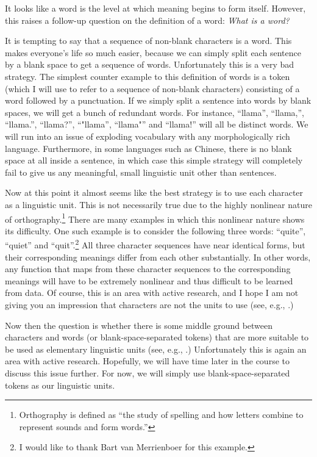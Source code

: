\documentclass{report}
\begin{document}
It looks like a word is the level at which meaning begins to form itself.
However, this raises a follow-up question on the definition of a word: {\em What
is a word?}

It is tempting to say that a sequence of non-blank characters is a word. This
makes everyone's life so much easier, because we can simply split each sentence
by a blank space to get a sequence of words. Unfortunately this is a very bad
strategy. The simplest counter example to this definition of words is a token
(which I will use to refer to a sequence of non-blank characters) consisting of
a word followed by a punctuation. If we simply split a sentence into words by
blank spaces, we will get a bunch of redundant words. For instance, ``llama'',
``llama,'', ``llama.'', ``llama?'', ``"llama'', ``llama"'' and ``llama!'' will
all be distinct words. We will run into an issue of exploding vocabulary with
any morphologically rich language. Furthermore, in some languages such as
Chinese, there is no blank space at all inside a sentence, in which case this
simple strategy will completely fail to give us any meaningful, small linguistic
unit other than sentences.

Now at this point it almost seems like the best strategy is to use each
character as a linguistic unit. This is not necessarily true due to the highly
nonlinear nature of orthography.\footnote{
    Orthography is defined as ``the study of spelling and how letters combine to
    represent sounds and form words.''
} There are many examples in which this nonlinear nature shows its difficulty.
One such example is to consider the following three words: ``quite'', ``quiet''
and ``quit''.\footnote{
    I would like to thank Bart van Merrienboer for this example.
}
All three character sequences have near identical forms, but their corresponding
meanings differ from each other substantially. In other words, any function that
maps from these character sequences to the corresponding meanings will have to
be extremely nonlinear and thus difficult to be learned from data. Of course,
this is an area with active research, and I hope I am not giving you an
impression that characters are not the units to use (see, e.g.,
\cite{kim2015character}.)

Now then the question is whether there is some middle ground between characters
and words (or blank-space-separated tokens) that are more suitable to be used as
elementary linguistic units (see, e.g., \cite{sennrich2015neural}.)
Unfortunately this is again an area with active research.  Hopefully, we will
have time later in the course to discuss this issue further.  For now, we will
simply use blank-space-separated tokens as our linguistic units.
\end{document}
